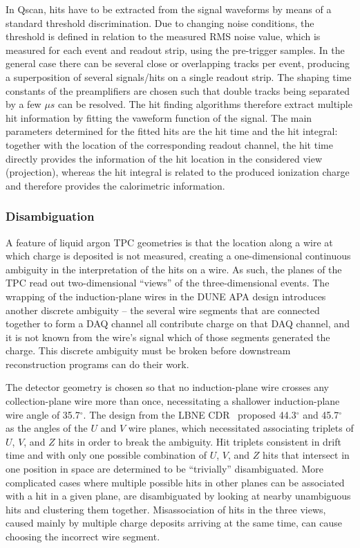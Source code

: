 In Qscan, hits have to be extracted from the signal waveforms by means of a standard threshold discrimination. 
Due to changing noise conditions, the threshold is defined in relation to the measured RMS noise value, 
which is measured for each event and readout strip, using the pre-trigger samples.
In the general case there can be several close or overlapping tracks per event, producing a superposition of several signals/hits on a single readout strip. 
The shaping time constants of the preamplifiers are chosen such that double tracks being separated by a few $\mu s$ can be resolved.
The hit finding algorithms therefore extract multiple hit information by fitting the vaweform function of the signal.
The main parameters determined for the fitted hits are the hit time and the hit integral: 
together with the location of the corresponding readout channel, the hit time directly provides the information of the hit location in the considered view (projection), whereas the hit integral is related to the produced ionization charge and therefore provides the calorimetric information.


\subsubsection{Disambiguation}

A feature of liquid argon TPC geometries is that the location along a
wire at which charge is deposited is not measured, creating a
one-dimensional continuous ambiguity in the interpretation of the hits
on a wire.  As such, the planes of the TPC read out two-dimensional
``views'' of the three-dimensional events.  The wrapping of the
induction-plane wires in the DUNE APA design introduces another
discrete ambiguity -- the several wire segments that are connected
together to form a DAQ channel all contribute charge on that DAQ
channel, and it is not known from the wire's signal which of those
segments generated the charge.  This discrete ambiguity must be broken
before downstream reconstruction programs can do their work.

The detector geometry is chosen so that no induction-plane wire
crosses any collection-plane wire more than once, necessitating a
shallower induction-plane wire angle of 35.7$^\circ$.  The design from
the LBNE CDR~\cite{lbnecdr} proposed 44.3$^\circ$ and 45.7$^\circ$ as
the angles of the $U$ and $V$ wire planes, which necessitated
associating triplets of $U$, $V$, and $Z$ hits in order to break the
ambiguity.  Hit triplets consistent in drift time and with only one
possible combination of $U$, $V$, and $Z$ hits that intersect in one
position in space are determined to be ``trivially'' disambiguated.
More complicated cases where multiple possible hits in other planes
can be associated with a hit in a given plane, are disambiguated by
looking at nearby unambiguous hits and clustering them together.
Misassociation of hits in the three views, caused mainly by multiple
charge deposits arriving at the same time, can cause choosing the
incorrect wire segment.

